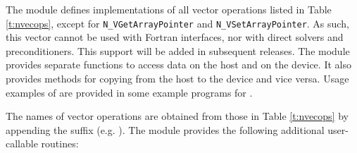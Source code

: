 The {\nveccuda} module defines implementations of all vector operations listed 
in Table \ref{t:nvecops}, except for \verb|N_VGetArrayPointer| and 
\verb|N_VSetArrayPointer|. 
As such, this vector cannot be used with {\sundials} Fortran interfaces,
nor with {\sundials} direct solvers and preconditioners. This support
will be added in subsequent {\sundials} releases. 
The {\nveccuda} module provides separate functions to access data on the host
and on the device. It also provides methods for copying from the host to 
the device and vice versa. Usage examples of {\nveccuda} are provided in
some example programs for {\cvode} \cite{cvode_ex}.

The names of vector operations are obtained from those in 
Table \ref{t:nvecops} by appending the suffix  (e.g. ).
The module {\nveccuda}  provides the following additional user-callable routines:
